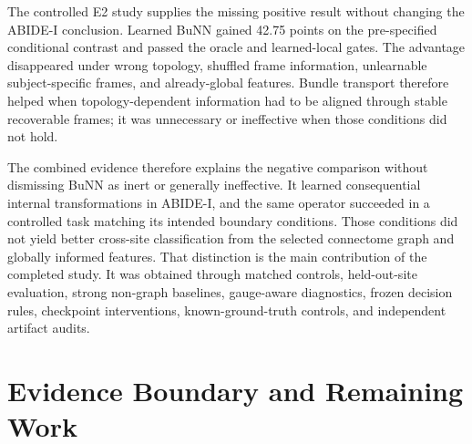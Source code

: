 \documentclass[11pt,a4paper]{article}
\begin{document}
The controlled E2 study supplies the missing positive result without changing
the ABIDE-I conclusion. Learned BuNN gained 42.75 points on the pre-specified
conditional contrast and passed the oracle and learned-local gates. The
advantage disappeared under wrong topology, shuffled frame information,
unlearnable subject-specific frames, and already-global features. Bundle
transport therefore helped when topology-dependent information had to be
aligned through stable recoverable frames; it was unnecessary or ineffective
when those conditions did not hold.

The combined evidence therefore explains the negative comparison without
dismissing BuNN as inert or generally ineffective. It learned consequential
internal transformations in ABIDE-I, and the same operator succeeded in a
controlled task matching its intended boundary conditions. Those conditions
did not yield better cross-site classification from the selected connectome
graph and globally informed features. That distinction is the main
contribution of the completed study. It was obtained through matched controls,
held-out-site evaluation, strong non-graph baselines, gauge-aware diagnostics,
frozen decision rules, checkpoint interventions, known-ground-truth controls,
and independent artifact audits.

\clearpage
\section*{Evidence Boundary and Remaining Work}
\end{document}
